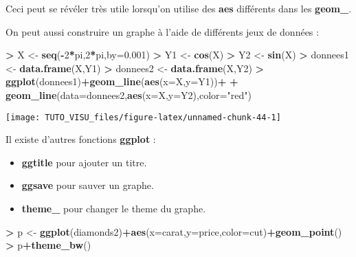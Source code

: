 \documentclass[]{book}
\newenvironment{Shaded}{\begin{snugshade}}{\end{snugshade}}
\newcommand{\DataTypeTok}[1]{\textcolor[rgb]{0.13,0.29,0.53}{#1}}
\newcommand{\DecValTok}[1]{\textcolor[rgb]{0.00,0.00,0.81}{#1}}
\newcommand{\FloatTok}[1]{\textcolor[rgb]{0.00,0.00,0.81}{#1}}
\newcommand{\KeywordTok}[1]{\textcolor[rgb]{0.13,0.29,0.53}{\textbf{#1}}}
\newcommand{\NormalTok}[1]{#1}
\newcommand{\OperatorTok}[1]{\textcolor[rgb]{0.81,0.36,0.00}{\textbf{#1}}}
\newcommand{\StringTok}[1]{\textcolor[rgb]{0.31,0.60,0.02}{#1}}
\providecommand{\tightlist}{%
  \setlength{\itemsep}{0pt}\setlength{\parskip}{0pt}}
\theoremstyle{definition}
\theoremstyle{definition}
\theoremstyle{definition}
\theoremstyle{remark}
\begin{document}
Ceci peut se révéler très utile lorsqu'on utilise des \textbf{aes} différents dans les \textbf{geom\_}.

On peut aussi construire un graphe à l'aide de différents jeux de données :

\begin{Shaded}
\begin{Highlighting}[]
\OperatorTok{>}\StringTok{ }\NormalTok{X <-}\StringTok{ }\KeywordTok{seq}\NormalTok{(}\OperatorTok{-}\DecValTok{2}\OperatorTok{*}\NormalTok{pi,}\DecValTok{2}\OperatorTok{*}\NormalTok{pi,}\DataTypeTok{by=}\FloatTok{0.001}\NormalTok{)}
\OperatorTok{>}\StringTok{ }\NormalTok{Y1 <-}\StringTok{ }\KeywordTok{cos}\NormalTok{(X)}
\OperatorTok{>}\StringTok{ }\NormalTok{Y2 <-}\StringTok{ }\KeywordTok{sin}\NormalTok{(X)}
\OperatorTok{>}\StringTok{ }\NormalTok{donnees1 <-}\StringTok{ }\KeywordTok{data.frame}\NormalTok{(X,Y1)}
\OperatorTok{>}\StringTok{ }\NormalTok{donnees2 <-}\StringTok{ }\KeywordTok{data.frame}\NormalTok{(X,Y2)}
\OperatorTok{>}\StringTok{ }\KeywordTok{ggplot}\NormalTok{(donnees1)}\OperatorTok{+}\KeywordTok{geom_line}\NormalTok{(}\KeywordTok{aes}\NormalTok{(}\DataTypeTok{x=}\NormalTok{X,}\DataTypeTok{y=}\NormalTok{Y1))}\OperatorTok{+}
\OperatorTok{+}\StringTok{   }\KeywordTok{geom_line}\NormalTok{(}\DataTypeTok{data=}\NormalTok{donnees2,}\KeywordTok{aes}\NormalTok{(}\DataTypeTok{x=}\NormalTok{X,}\DataTypeTok{y=}\NormalTok{Y2),}\DataTypeTok{color=}\StringTok{"red"}\NormalTok{)}
\end{Highlighting}
\end{Shaded}

\begin{center}\texttt{[image: TUTO\_VISU\_files/figure-latex/unnamed-chunk-44-1]} \end{center}

Il existe d'autres fonctions \textbf{ggplot} :

\begin{itemize}
\tightlist
\item
  \textbf{ggtitle} pour ajouter un titre.
\item
  \textbf{ggsave} pour sauver un graphe.
\item
  \textbf{theme\_} pour changer le theme du graphe.
\end{itemize}

\begin{Shaded}
\begin{Highlighting}[]
\OperatorTok{>}\StringTok{ }\NormalTok{p <-}\StringTok{ }\KeywordTok{ggplot}\NormalTok{(diamonds2)}\OperatorTok{+}\KeywordTok{aes}\NormalTok{(}\DataTypeTok{x=}\NormalTok{carat,}\DataTypeTok{y=}\NormalTok{price,}\DataTypeTok{color=}\NormalTok{cut)}\OperatorTok{+}\KeywordTok{geom_point}\NormalTok{()}
\OperatorTok{>}\StringTok{ }\NormalTok{p}\OperatorTok{+}\KeywordTok{theme_bw}\NormalTok{()}
\end{Highlighting}
\end{Shaded}
\end{document}
